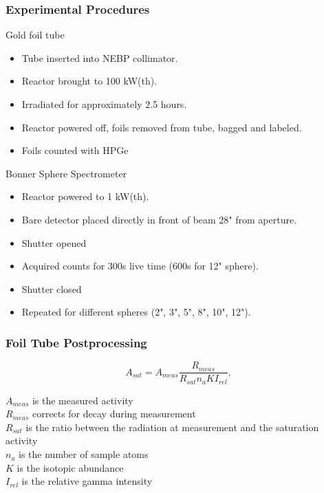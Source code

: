 \documentclass[fleqn]{beamer}
\begin{document}
\begin{frame}
\frametitle{Experimental Procedures}

Gold foil tube
\begin{itemize}
\item Tube inserted into NEBP collimator.
\item Reactor brought to 100 kW(th).
\item Irradiated for approximately 2.5 hours.
\item Reactor powered off, foils removed from tube, bagged and labeled.
\item Foils counted with HPGe
\end{itemize}

Bonner Sphere Spectrometer
\begin{itemize}
\item Reactor powered to 1 kW(th).
\item Bare detector placed directly in front of beam 28" from aperture.
\item Shutter opened
\item Acquired counts for 300s live time (600s for 12" sphere).
\item Shutter closed
\item Repeated for different spheres (2", 3", 5", 8", 10", 12").
\end{itemize}
\end{frame}

\begin{frame}
\frametitle{Foil Tube Postprocessing}

\begin{equation}
\label{eqn:a_sat}
A_{sat} = A_{meas} \frac{R_{meas}}{R_{sat} n_a K I_{rel}} ,
\end{equation}

$A_{meas}$ is the measured activity\\
$R_{meas}$ corrects for decay during measurement\\
$R_{sat}$ is the ratio between the radiation at measurement and the saturation activity\\
$n_a$ is the number of sample atoms\\
$K$ is the isotopic abundance\\
$I_{rel}$ is the relative gamma intensity\\

\end{frame}
\end{document}
